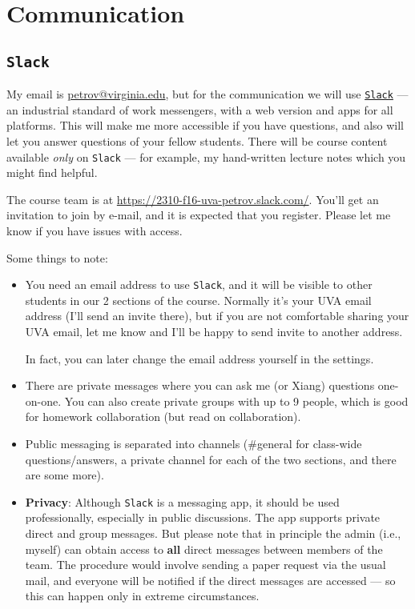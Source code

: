 \documentclass[oneside,11pt]{amsart}
\begin{document}
\section{Communication} \label{comm} 
\subsection{\texttt{Slack}}

My email is \href{mailto:petrov@virginia.edu}{petrov@virginia.edu}, but for the communication we will use \href{https://slack.com}{\texttt{Slack}} --- an industrial standard of work messengers, with a web version and apps for all platforms. This will make me more accessible if you have questions, and also will let you answer questions of your fellow students. There will be course content available \emph{only} on \texttt{Slack} --- for example, my hand-written lecture notes which you might find helpful.

The course team is at \url{https://2310-f16-uva-petrov.slack.com/}. You'll get an invitation to join by e-mail, and it is expected that you register. Please let me know if you have issues with access. 

Some things to note:
\begin{itemize}
	\item You need an email address to use \texttt{Slack}, and it will be visible to other students in our 2 sections of the course. Normally it's your UVA email address (I'll send an invite there), but if you are not comfortable sharing your UVA email, let me know and I'll be happy to send invite to another address.

	\noindent In fact, you can later change the email address yourself in the settings.

	\item There are private messages where you can ask me (or Xiang) questions one-on-one. You can also create private groups with up to 9 people, which is good for homework collaboration (but read  on collaboration).
	\item Public messaging is separated into channels (\#general for class-wide questions/answers, a private channel for each of the two sections, and there are some more).
	\item \textbf{Privacy}: Although \texttt{Slack} is a messaging app, it should be used professionally, especially in public discussions. The app supports private direct and group messages. But please note that in principle the admin (i.e., myself) can obtain access to \textbf{all} direct messages between members of the team. The procedure would involve sending a paper request via the usual mail, and everyone will be notified if the direct messages are accessed --- so this can happen only in extreme circumstances.
\end{itemize}
\end{document}
